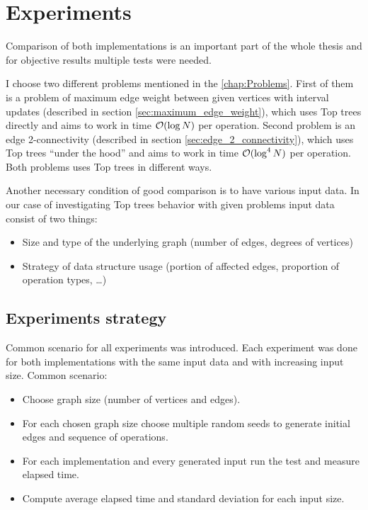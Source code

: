 \chapter{Experiments}
\label{chap:Experiments}

Comparison of both implementations is an important part of the whole thesis
and for objective results multiple tests were needed.

I choose two different problems mentioned in the \cref{chap:Problems}.
First of them is a problem of maximum edge weight between given vertices with
interval updates (described in section \ref{sec:maximum_edge_weight}), which uses
Top trees directly and aims to work in time ${\cal O}(\log N)$ per operation. Second
problem is an edge 2-connectivity (described in section \ref{sec:edge_2_connectivity}),
which uses Top trees ``under the hood'' and aims to work in time ${\cal O}(\log^4 N)$
per operation. Both problems uses Top trees in different ways.

Another necessary condition of good comparison is to have various input data. In
our case of investigating Top trees behavior with given problems input data
consist of two things:
\begin{itemize}
\item Size and type of the underlying graph (number of edges, degrees of vertices)
\item Strategy of data structure usage (portion of affected edges, proportion of
operation types, \dots)
\end{itemize}

\section{Experiments strategy}

Common scenario for all experiments was introduced. Each experiment was done
for both implementations with the same input data and with increasing input
size. Common scenario:

\begin{itemize}
\item Choose graph size (number of vertices and edges).
\item For each chosen graph size choose multiple random seeds to generate
initial edges and sequence of operations.
\item For each implementation and every generated input run the test and measure elapsed time.
\item Compute average elapsed time and standard deviation for each input size.
\end{itemize}

